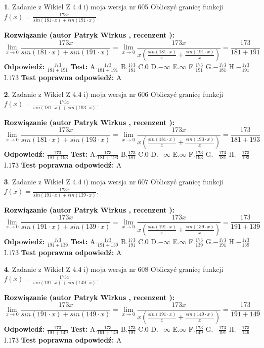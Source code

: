 \documentclass[12pt, a4paper]{article}
\theoremstyle{definition} %
\newtheorem{zad}{}
\newcommand{\zadStart}[1]{\begin{zad}#1\newline}
\newcommand{\zadStop}{\end{zad}}
\newcommand{\rozwStart}[2]{\noindent \textbf{Rozwiązanie (autor #1 , recenzent #2): }\newline}
\newcommand{\rozwStop}{\newline}
\newcommand{\odpStart}{\noindent \textbf{Odpowiedź:}\newline}
\newcommand{\odpStop}{\newline}
\newcommand{\testStart}{\noindent \textbf{Test:}\newline}
\newcommand{\testStop}{\newline}
\newcommand{\kluczStart}{\noindent \textbf{Test poprawna odpowiedź:}\newline}
\newcommand{\kluczStop}{\newline}
\begin{document}
\zadStart{Zadanie z Wikieł Z 4.4 i) moja wersja nr 605}
Obliczyć granicę funkcji $f(x)=\frac{173x}{sin(181\cdot x) +sin(191\cdot x)}$.
\zadStop
\rozwStart{Patryk Wirkus}{}
$$\lim\limits_{x\to 0}\frac{173x}{sin(181\cdot x) +sin(191\cdot x)}=\lim\limits_{x\to 0}\frac{173x}{x(\frac{sin(181\cdot x)}{x}+\frac{sin(191\cdot x)}{x})}=\frac{173}{181+191}$$
\rozwStop
\odpStart
$\frac{173}{181+191}$
\odpStop
\testStart
A.$\frac{173}{181+191}$
B.$\frac{173}{181}$
C.$0$
D.$-\infty$
E.$\infty$
F.$\frac{173}{191}$
G.$-\frac{173}{181}$
H.$-\frac{173}{191}$
I.$173$
\testStop
\kluczStart
A
\kluczStop



\zadStart{Zadanie z Wikieł Z 4.4 i) moja wersja nr 606}
Obliczyć granicę funkcji $f(x)=\frac{173x}{sin(181\cdot x) +sin(193\cdot x)}$.
\zadStop
\rozwStart{Patryk Wirkus}{}
$$\lim\limits_{x\to 0}\frac{173x}{sin(181\cdot x) +sin(193\cdot x)}=\lim\limits_{x\to 0}\frac{173x}{x(\frac{sin(181\cdot x)}{x}+\frac{sin(193\cdot x)}{x})}=\frac{173}{181+193}$$
\rozwStop
\odpStart
$\frac{173}{181+193}$
\odpStop
\testStart
A.$\frac{173}{181+193}$
B.$\frac{173}{181}$
C.$0$
D.$-\infty$
E.$\infty$
F.$\frac{173}{193}$
G.$-\frac{173}{181}$
H.$-\frac{173}{193}$
I.$173$
\testStop
\kluczStart
A
\kluczStop



\zadStart{Zadanie z Wikieł Z 4.4 i) moja wersja nr 607}
Obliczyć granicę funkcji $f(x)=\frac{173x}{sin(191\cdot x) +sin(139\cdot x)}$.
\zadStop
\rozwStart{Patryk Wirkus}{}
$$\lim\limits_{x\to 0}\frac{173x}{sin(191\cdot x) +sin(139\cdot x)}=\lim\limits_{x\to 0}\frac{173x}{x(\frac{sin(191\cdot x)}{x}+\frac{sin(139\cdot x)}{x})}=\frac{173}{191+139}$$
\rozwStop
\odpStart
$\frac{173}{191+139}$
\odpStop
\testStart
A.$\frac{173}{191+139}$
B.$\frac{173}{191}$
C.$0$
D.$-\infty$
E.$\infty$
F.$\frac{173}{139}$
G.$-\frac{173}{191}$
H.$-\frac{173}{139}$
I.$173$
\testStop
\kluczStart
A
\kluczStop



\zadStart{Zadanie z Wikieł Z 4.4 i) moja wersja nr 608}
Obliczyć granicę funkcji $f(x)=\frac{173x}{sin(191\cdot x) +sin(149\cdot x)}$.
\zadStop
\rozwStart{Patryk Wirkus}{}
$$\lim\limits_{x\to 0}\frac{173x}{sin(191\cdot x) +sin(149\cdot x)}=\lim\limits_{x\to 0}\frac{173x}{x(\frac{sin(191\cdot x)}{x}+\frac{sin(149\cdot x)}{x})}=\frac{173}{191+149}$$
\rozwStop
\odpStart
$\frac{173}{191+149}$
\odpStop
\testStart
A.$\frac{173}{191+149}$
B.$\frac{173}{191}$
C.$0$
D.$-\infty$
E.$\infty$
F.$\frac{173}{149}$
G.$-\frac{173}{191}$
H.$-\frac{173}{149}$
I.$173$
\testStop
\kluczStart
A
\kluczStop
\end{document}
